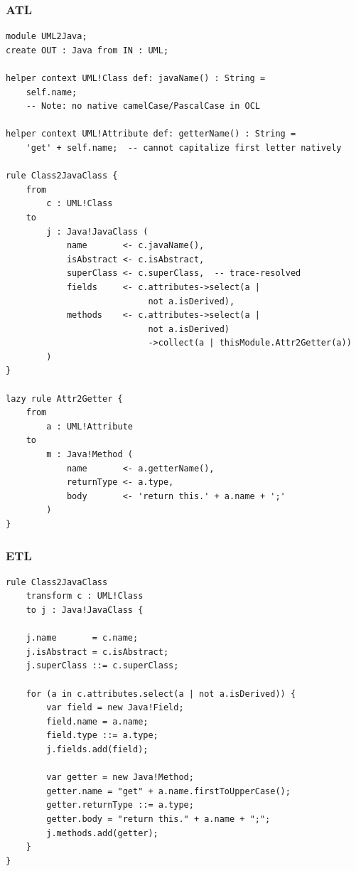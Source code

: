 \documentclass[11pt,a4paper]{article}
\begin{document}
\subsubsection{ATL}

\begin{lstlisting}[style=atl,caption={UML2Java structural mapping in ATL}]
module UML2Java;
create OUT : Java from IN : UML;

helper context UML!Class def: javaName() : String =
    self.name;
    -- Note: no native camelCase/PascalCase in OCL

helper context UML!Attribute def: getterName() : String =
    'get' + self.name;  -- cannot capitalize first letter natively

rule Class2JavaClass {
    from
        c : UML!Class
    to
        j : Java!JavaClass (
            name       <- c.javaName(),
            isAbstract <- c.isAbstract,
            superClass <- c.superClass,  -- trace-resolved
            fields     <- c.attributes->select(a |
                            not a.isDerived),
            methods    <- c.attributes->select(a |
                            not a.isDerived)
                            ->collect(a | thisModule.Attr2Getter(a))
        )
}

lazy rule Attr2Getter {
    from
        a : UML!Attribute
    to
        m : Java!Method (
            name       <- a.getterName(),
            returnType <- a.type,
            body       <- 'return this.' + a.name + ';'
        )
}
\end{lstlisting}

\subsubsection{ETL}

\begin{lstlisting}[style=etl,caption={UML2Java structural mapping in ETL}]
rule Class2JavaClass
    transform c : UML!Class
    to j : Java!JavaClass {

    j.name       = c.name;
    j.isAbstract = c.isAbstract;
    j.superClass ::= c.superClass;

    for (a in c.attributes.select(a | not a.isDerived)) {
        var field = new Java!Field;
        field.name = a.name;
        field.type ::= a.type;
        j.fields.add(field);

        var getter = new Java!Method;
        getter.name = "get" + a.name.firstToUpperCase();
        getter.returnType ::= a.type;
        getter.body = "return this." + a.name + ";";
        j.methods.add(getter);
    }
}
\end{lstlisting}
\end{document}
